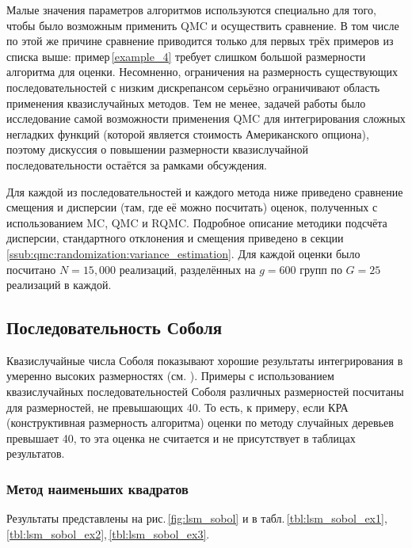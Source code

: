 Малые значения параметров алгоритмов используются специально для того, чтобы было возможным применить QMC и осуществить сравнение. В том числе по этой же причине сравнение приводится только для первых трёх примеров из списка выше: пример\,\ref{example_4} требует слишком большой размерности алгоритма для оценки. Несомненно, ограничения на размерность существующих последовательностей с низким дискрепансом серьёзно ограничивают область применения квазислучайных методов. Тем не менее, задачей работы было исследование самой возможности применения QMC для интегрирования сложных негладких функций (которой является стоимость Американского опциона), поэтому дискуссия о повышении размерности квазислучайной последовательности остаётся за рамками обсуждения.

Для каждой из последовательностей и каждого метода ниже приведено сравнение смещения и дисперсии (там, где её можно посчитать) оценок, полученных с использованием MC, QMC и RQMC. Подробное описание методики подсчёта дисперсии, стандартного отклонения и смещения приведено в секции \ref{ssub:qmc:randomization:variance_estimation}. Для каждой оценки было посчитано $N = 15,000$ реализаций, разделённых на $g = 600$ групп по $G = 25$ реализаций в каждой. 

\subsection{Последовательность Соболя} %
\label{sub:results:qmc_to_classical:sobol}

Квазислучайные числа Соболя показывают хорошие результаты интегрирования в умеренно высоких размерностях (см. \cite{sobol}). Примеры с использованием квазислучайных последовательностей Соболя различных размерностей посчитаны для размерностей, не превышающих 40. То есть, к примеру, если КРА (конструктивная размерность алгоритма) оценки по методу случайных деревьев превышает 40, то эта оценка не считается и не присутствует в таблицах результатов.

\subsubsection{Метод наименьших квадратов} %
\label{ssub:results:qmc_to_classical:sobol:lsm}

Результаты представлены на рис.\,\ref{fig:lsm_sobol} и в табл.\,\ref{tbl:lsm_sobol_ex1},\,\ref{tbl:lsm_sobol_ex2},\,\ref{tbl:lsm_sobol_ex3}.

